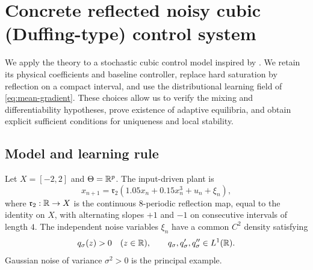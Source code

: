 \section{Concrete reflected noisy cubic (Duffing-type) control system}
\label{sec:duffing-example}

We apply the theory to a stochastic cubic control model inspired by
\cite{LippiActionError}. We retain its physical coefficients and baseline
controller, replace hard saturation by reflection on a compact interval,
and use the distributional learning field of \eqref{eq:mean-gradient}.
These choices allow us to verify the mixing and differentiability hypotheses,
prove existence of adaptive equilibria, and obtain explicit sufficient
conditions for uniqueness and local stability.

\subsection{Model and learning rule}
\label{sec:duffing-loss}

Let $X=[-2,2]$ and $\Theta=\mathbb{R}^p$. The input-driven plant is
\begin{equation}
  x_{n+1}=\mathfrak r_2\!\left(1.05x_n+0.15x_n^3+u_n+\xi_n\right),
  \label{eq:duffing-stochastic-plant}
\end{equation}
where $\mathfrak r_2:\mathbb{R}\to X$ is the continuous $8$-periodic reflection
map, equal to the identity on $X$, with alternating slopes $+1$ and $-1$
on consecutive intervals of length $4$. The independent noise variables
$\xi_n$ have a common $C^2$ density satisfying
\begin{equation}
  q_\sigma(z)>0\quad(z\in\mathbb{R}),
  \qquad q_\sigma,q_\sigma',q_\sigma''\in L^1(\mathbb{R}).
  \label{eq:duffing-noise-assumption}
\end{equation}
Gaussian noise of variance $\sigma^2>0$ is the principal example.

